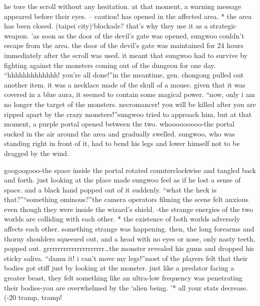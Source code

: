  he tore the scroll without any hesitation.
at that moment, a warning message appeared before their eyes.
– caution!  has opened in the affected area.
* the area has been closed.
 (taipei city)‘blockade? that’s why they use it as a strategic weapon.
’as soon as the door of the devil’s gate was opened, sungwoo couldn’t escape from the area.
 the door of the devil’s gate was maintained for 24 hours immediately after the scroll was used.
 it meant that sungwoo had to survive by fighting against the monsters coming out of the dungeon for one day.
“hhhhhhhhhhhhh! you’re all done!”in the meantime, gen.
 chongong pulled out another item.
 it was a necklace made of the skull of a mouse.
 given that it was covered in a blue aura, it seemed to contain some magical power.
“now, only i am no longer the target of the monsters.
 necromancer! you will be killed after you are ripped apart by the crazy monsters!”sungwoo tried to approach him, but at that moment, a purple portal opened between the two.
whooooooooo-the portal sucked in the air around the area and gradually swelled.
 sungwoo, who was standing right in front of it, had to bend his legs and lower himself not to be dragged by the wind.


googoogooo-the space inside the portal rotated counterclockwise and tangled back and forth.
 just looking at the place made sungwoo feel as if he lost a sense of space.
and a black hand popped out of it suddenly.
“what the heck is that?”“something ominous?”the camera operators filming the scene felt anxious even though they were inside the wizard’s shield.
-the strange energies of the two worlds are colliding with each other.
* the existence of both worlds adversely affects each other.
something strange was happening.
then, the long forearms and thorny shoulders squeezed out, and a head with no eyes or nose, only nasty teeth, popped out.
grrrrrrrrrrrrrrrrrrrrr…the monster revealed his gums and dropped his sticky saliva.
“damn it! i can’t move my legs!”most of the players felt that their bodies got stiff just by looking at the monster.
 just like a predator facing a greater beast, they felt something like an ultra-low frequency was penetrating their bodies-you are overwhelmed by the ‘alien being.
’* all your stats decrease.
 (-20%
tramp, tramp!

 